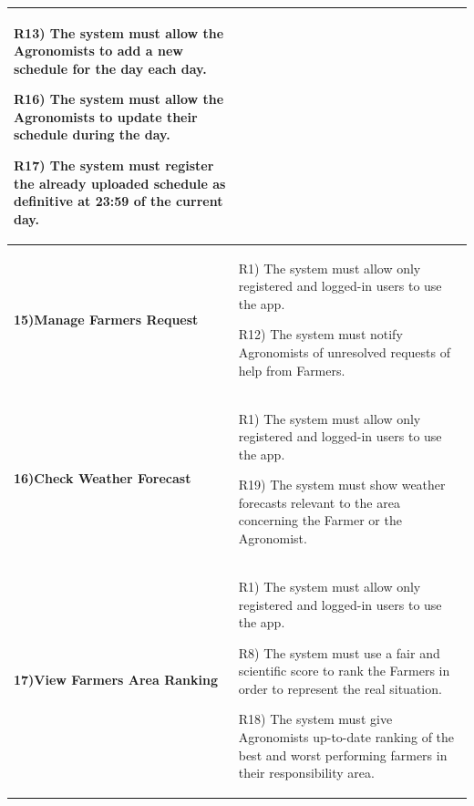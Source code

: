 \documentclass[table, 12pt]{article}
\begin{document}
\begin{itemize}
\begin{longtable}{|p{}|p{}|}
                                                                                         R13) The system must allow the Agronomists to add a new schedule for the day each day.
                                                                                        
                                                                                         R16) The system must allow the Agronomists to update their schedule during the day.

                                                                                         R17) The system must register the already uploaded schedule as definitive at 23:59 of the current day.\\\hline
                    
                    \cellcolor{SpringGreen!50}\textbf{15)Manage Farmers Request}\centering &  R1) The system must allow only registered and logged-in users to use the app.
                    
                                                                                    R12) The system must notify Agronomists of unresolved requests of help from Farmers.\\\hline
                    
                    \cellcolor{SpringGreen!50}\textbf{16)Check Weather Forecast}\centering & R1) The system must allow only registered and logged-in users to use the app.
                    
                                                                                     R19) The system must show weather forecasts relevant to the area concerning the Farmer or the Agronomist.\\\hline
                    \cellcolor{SpringGreen!50}\textbf{17)View Farmers Area Ranking}\centering&  R1) The system must allow only registered and logged-in users to use the app.

                                                                                       R8) The system must use a fair and scientific score to rank the Farmers in order to represent the real situation.
                                                                                       
                                                                                       R18) The system must give Agronomists up-to-date ranking of the best and worst performing farmers in their responsibility area.\\\hline
                    
        \end{longtable}
    
    \end{itemize}
\end{document}
